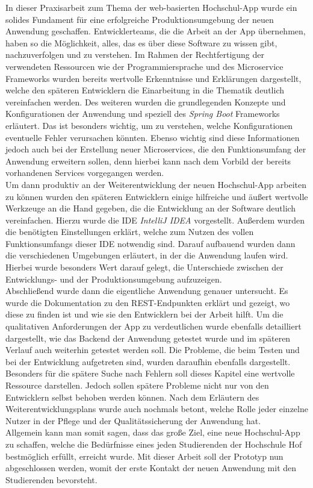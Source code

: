 In dieser Praxisarbeit zum Thema der web-basierten Hochschul-\ac{App} wurde ein solides Fundament für eine erfolgreiche Produktionsumgebung der neuen Anwendung geschaffen. Entwicklerteams, die die Arbeit an der \ac{App} übernehmen, haben so die Möglichkeit, alles, das es über diese Software zu wissen gibt, nachzuverfolgen und zu verstehen. Im Rahmen der Rechtfertigung der verwendeten Ressourcen wie der Programmiersprache und des Microservice Frameworks wurden bereits wertvolle Erkenntnisse und Erklärungen dargestellt, welche den späteren Entwicklern die Einarbeitung in die Thematik deutlich vereinfachen werden. Des weiteren wurden die grundlegenden Konzepte und Konfigurationen der Anwendung und speziell des \textit{Spring Boot} Frameworks erläutert. Das ist besonders wichtig, um zu verstehen, welche Konfigurationen eventuelle Fehler verursachen könnten. Ebenso wichtig sind diese Informationen jedoch auch bei der Erstellung neuer Microservices, die den Funktionsumfang der Anwendung erweitern sollen, denn hierbei kann nach dem Vorbild der bereits vorhandenen Services vorgegangen werden.\\
\linebreak
Um dann produktiv an der Weiterentwicklung der neuen Hochschul-\ac{App} arbeiten zu können wurden den späteren Entwicklern einige hilfreiche und äußert wertvolle Werkzeuge an die Hand gegeben, die die Entwicklung an der Software deutlich vereinfachen. Hierzu wurde die \ac{IDE} \textit{IntelliJ IDEA} vorgestellt. Außerdem wurden die benötigten Einstellungen erklärt, welche zum Nutzen des vollen Funktionsumfangs dieser \ac{IDE} notwendig sind. Darauf aufbauend wurden dann die verschiedenen Umgebungen erläutert, in der die Anwendung laufen wird. Hierbei wurde besonders Wert darauf gelegt, die Unterschiede zwischen der Entwicklungs- und der Produktionsumgebung aufzuzeigen.\\
\linebreak
Abschließend wurde dann die eigentliche Anwendung genauer untersucht. Es wurde die Dokumentation zu den \ac{REST}-Endpunkten erklärt und gezeigt, wo diese zu finden ist und wie sie den Entwicklern bei der Arbeit hilft. Um die qualitativen Anforderungen der \ac{App} zu verdeutlichen wurde ebenfalls detailliert dargestellt, wie das Backend der Anwendung getestet wurde und im späteren Verlauf auch weiterhin getestet werden soll. Die Probleme, die beim Testen und bei der Entwicklung aufgetreten sind, wurden daraufhin ebenfalls dargestellt. Besonders für die spätere Suche nach Fehlern soll dieses Kapitel eine wertvolle Ressource darstellen. Jedoch sollen spätere Probleme nicht nur von den Entwicklern selbst behoben werden können. Nach dem Erläutern des Weiterentwicklungsplans wurde auch nochmals betont, welche Rolle jeder einzelne Nutzer in der Pflege und der Qualitätssicherung der Anwendung hat.\\
\linebreak
Allgemein kann man somit sagen, dass das große Ziel, eine neue Hochschul-\ac{App} zu schaffen, welche die Bedürfnisse eines jeden Studierenden der Hochschule Hof bestmöglich erfüllt, erreicht wurde. Mit dieser Arbeit soll der Prototyp nun abgeschlossen werden, womit der erste Kontakt der neuen Anwendung mit den Studierenden bevorsteht.
